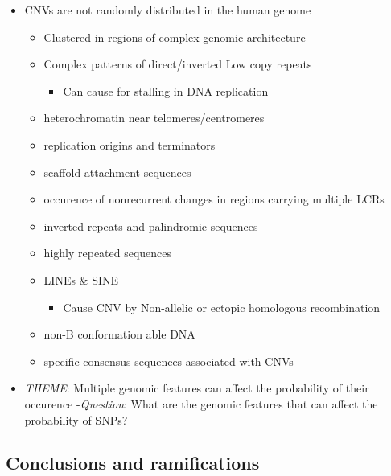 \documentclass[]{book}
\providecommand{\tightlist}{%
  \setlength{\itemsep}{0pt}\setlength{\parskip}{0pt}}
\begin{document}
\begin{itemize}
\tightlist
\item
  CNVs are not randomly distributed in the human genome

  \begin{itemize}
  \tightlist
  \item
    Clustered in regions of complex genomic architecture
  \item
    Complex patterns of direct/inverted Low copy repeats

    \begin{itemize}
    \tightlist
    \item
      Can cause for stalling in DNA replication
    \end{itemize}
  \item
    heterochromatin near telomeres/centromeres
  \item
    replication origins and terminators
  \item
    scaffold attachment sequences
  \item
    occurence of nonrecurrent changes in regions carrying multiple LCRs
  \item
    inverted repeats and palindromic sequences
  \item
    highly repeated sequences
  \item
    LINEs \& SINE

    \begin{itemize}
    \tightlist
    \item
      Cause CNV by Non-allelic or ectopic homologous recombination
    \end{itemize}
  \item
    non-B conformation able DNA
  \item
    specific consensus sequences associated with CNVs
  \end{itemize}
\item
  \emph{THEME}: Multiple genomic features can affect the probability of their occurence
  -\emph{Question}: What are the genomic features that can affect the probability of SNPs?
\end{itemize}

\hypertarget{conclusions-and-ramifications}{%
\subsection{Conclusions and ramifications}\label{conclusions-and-ramifications}}
\end{document}
